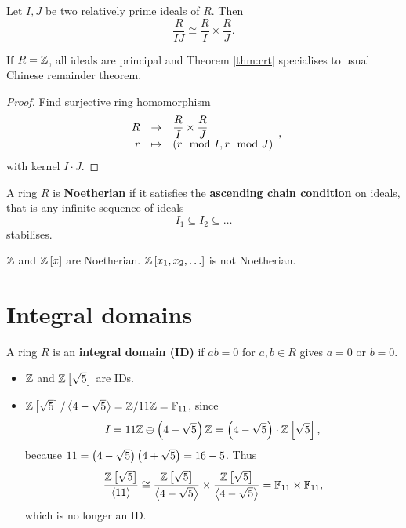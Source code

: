 \begin{theorem}
\label{thm:crt}
Let $ I, J $ be two relatively prime ideals of $ R $. Then
$$ \dfrac{R}{IJ} \cong \dfrac{R}{I} \times \dfrac{R}{J}. $$
\end{theorem}

\begin{remark1}
If $ R = \mathbb{Z} $, all ideals are principal and Theorem \ref{thm:crt} specialises to usual Chinese remainder theorem.
\end{remark1}

\begin{proof}
Find surjective ring homomorphism
$$ \function{R}{\dfrac{R}{I} \times \dfrac{R}{J}}{r}{\rb{r \mod I, r \mod J}}, $$
with kernel $ I \cdot J $.
\end{proof}

\begin{definition}
A ring $ R $ is \textbf{Noetherian} if it satisfies the \textbf{ascending chain condition} on ideals, that is any infinite sequence of ideals
$$ I_1 \subseteq I_2 \subseteq \dots $$
stabilises.
\end{definition}

\begin{example1}
$ \mathbb{Z} $ and $ \mathbb{Z}\left[ x \right] $ are Noetherian. $ \Z\sb{x_1, x_2, \dots} $ is not Noetherian.
\end{example1}


\section{Integral domains}

\begin{definition}
A ring $ R $ is an \textbf{integral domain (ID)} if $ ab = 0 $ for $ a, b \in R $ gives $ a = 0 $ or $ b = 0 $.
\end{definition}

\begin{example1}
\hfill
\begin{itemize}
\item $ \mathbb{Z} $ and $ \mathbb{Z}\left[ \sqrt{5} \right] $ are IDs.
\item $ \mathbb{Z}\left[ \sqrt{5} \right] / \left\langle 4 - \sqrt{5} \right\rangle = \mathbb{Z} / 11\mathbb{Z} = \mathbb{F}_{11} $, since
$$ I = 11\mathbb{Z} \oplus \left( 4 - \sqrt{5} \right)\mathbb{Z} = \left( 4 - \sqrt{5} \right) \cdot \mathbb{Z}\left[ \sqrt{5} \right], $$
because $ 11 = \left( 4 - \sqrt{5} \right)\left( 4 + \sqrt{5} \right) = 16 - 5 $. Thus
$$ \dfrac{\mathbb{Z}\left[ \sqrt{5} \right]}{\left\langle 11 \right\rangle} \cong \dfrac{\mathbb{Z}\left[ \sqrt{5} \right]}{\left\langle 4 - \sqrt{5} \right\rangle} \times \dfrac{\mathbb{Z}\left[ \sqrt{5} \right]}{\left\langle 4 - \sqrt{5} \right\rangle} = \mathbb{F}_{11} \times \mathbb{F}_{11}, $$
which is no longer an ID.
\end{itemize}
\end{example1}

